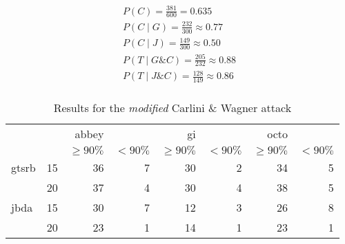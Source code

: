 \begin{align}
P(C) = \frac{381}{600} = 0.635\\[1ex]
P(C \mid G) = \frac{232}{300} \approx 0.77\\[1ex]
P(C \mid J) = \frac{149}{300} \approx 0.50\\[1ex]
P(T \mid G \& C) = \frac{205}{232} \approx 0.88\\[1ex]
P(T \mid J \& C) = \frac{128}{149} \approx 0.86\\[1ex]
\end{align}

\begin{table}
\begin{tabular}{l l | r r | r r | r r}
& & abbey & & gi & & octo & \\[1ex]
& & \footnotesize$\geq90\%$ & \footnotesize$<90\%$ & \footnotesize$\geq90\%$ & \footnotesize$<90\%$ & \footnotesize$\geq90\%$ & \footnotesize$<90\%$ \\[1ex]
\hline
gtsrb & 15 & 36 & 7 & 30 & 2 & 34 & 5
\\[1ex]
 & 20 & 37 & 4 & 30 & 4 & 38 & 5\\[1ex]
\hline
jbda & 15 & 30 & 7 & 12 & 3 & 26 & 8
\\[1ex]
  & 20 & 23 & 1 & 14 & 1 & 23 & 1\\[1ex]
\end{tabular}
\caption{Results for the \textit{modified} Carlini \& Wagner attack}
\label{tab:robust_result}
\end{table}